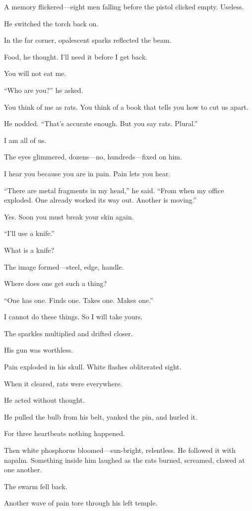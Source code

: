 A memory flickered—eight men falling before the pistol clicked empty. Useless.

He switched the torch back on.

In the far corner, opalescent sparks reflected the beam.

Food, he thought. I’ll need it before I get back.

You will not eat me.

“Who are you?” he asked.

You think of me as rats.
You think of a book that tells you how to cut us apart.

He nodded. “That’s accurate enough. But you say rats. Plural.”

I am all of us.

The eyes glimmered, dozens—no, hundreds—fixed on him.

I hear you because you are in pain. Pain lets you hear.

“There are metal fragments in my head,” he said. “From when my office exploded. One already worked its way out. Another is moving.”

Yes. Soon you must break your skin again.

“I’ll use a knife.”

What is a knife?

The image formed—steel, edge, handle.

Where does one get such a thing?

“One has one. Finds one. Takes one. Makes one.”

I cannot do these things.
So I will take yours.

The sparkles multiplied and drifted closer.

His gun was worthless.

Pain exploded in his skull. White flashes obliterated sight.

When it cleared, rats were everywhere.

He acted without thought.

He pulled the bulb from his belt, yanked the pin, and hurled it.

For three heartbeats nothing happened.

Then white phosphorus bloomed—sun-bright, relentless. He followed it with napalm. Something inside him laughed as the rats burned, screamed, clawed at one another.

The swarm fell back.

Another wave of pain tore through his left temple.

